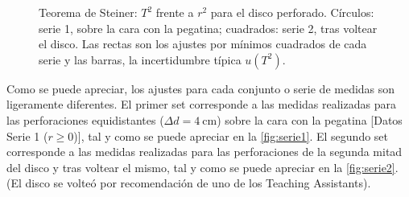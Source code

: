 \documentclass[a4paper,11pt]{amsart}
\numberwithin{equation}{section}
\theoremstyle{cienplano}
\theoremstyle{ciendef}
\theoremstyle{cienobs}
\begin{document}
\begin{figure}[ht]
\centering
{}
\caption{Teorema de Steiner: $T^{2}$ frente a $r^{2}$ para el disco
perforado. Círculos: serie 1, sobre la cara con la pegatina; cuadrados:
serie 2, tras voltear el disco. Las rectas son los ajustes por mínimos
cuadrados de cada serie y las barras, la incertidumbre típica $u(T^{2})$.}
\label{fig:disco}
\end{figure}

Como se puede apreciar, los ajustes para cada conjunto o serie de medidas son
ligeramente diferentes. El primer set corresponde a las medidas realizadas
para las perforaciones equidistantes ($\Delta d=\SI{4}{\centi\meter}$) sobre
la cara con la pegatina [Datos Serie 1 ($r\ge0$)], tal y como se puede
apreciar en la \cref{fig:serie1}. El segundo set corresponde a las medidas
realizadas para las perforaciones de la segunda mitad del disco y tras
voltear el mismo, tal y como se puede apreciar en la \cref{fig:serie2}. (El
disco se volteó por recomendación de uno de los Teaching Assistants).
\end{document}
